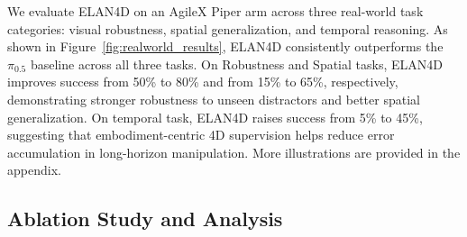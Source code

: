 We evaluate ELAN4D on an AgileX Piper arm across three real-world task categories: visual robustness, spatial generalization, and temporal reasoning. As shown in Figure~\ref{fig:realworld_results}, ELAN4D consistently outperforms the $\pi_{0.5}$ baseline across all three tasks. On Robustness and Spatial tasks, ELAN4D improves success from 50\% to 80\% and from 15\% to 65\%, respectively, demonstrating stronger robustness to unseen distractors and better spatial generalization. On temporal task, ELAN4D raises success from 5\% to 45\%, suggesting that embodiment-centric 4D supervision helps reduce error accumulation in long-horizon manipulation. More illustrations are provided in the appendix.\vspace{-1em}

\subsection{Ablation Study and Analysis}
\vspace{-1em}
